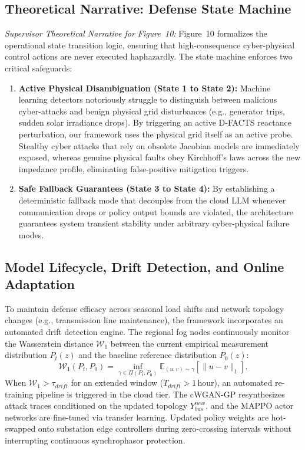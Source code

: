 \documentclass[journal,compsoc]{IEEEtran}
\begin{document}
\subsection{Theoretical Narrative: Defense State Machine}
\label{sec:narrative_fig10}
\textit{Supervisor Theoretical Narrative for Figure~10:}
Figure~10 formalizes the operational state transition logic, ensuring that high-consequence cyber-physical control actions are never executed haphazardly. The state machine enforces two critical safeguards:
\begin{enumerate}
    \item \textbf{Active Physical Disambiguation (State 1 to State 2):} Machine learning detectors notoriously struggle to distinguish between malicious cyber-attacks and benign physical grid disturbances (e.g., generator trips, sudden solar irradiance drops). By triggering an active D-FACTS reactance perturbation, our framework uses the physical grid itself as an active probe. Stealthy cyber attacks that rely on obsolete Jacobian models are immediately exposed, whereas genuine physical faults obey Kirchhoff's laws across the new impedance profile, eliminating false-positive mitigation triggers.
    \item \textbf{Safe Fallback Guarantees (State 3 to State 4):} By establishing a deterministic fallback mode that decouples from the cloud LLM whenever communication drops or policy output bounds are violated, the architecture guarantees system transient stability under arbitrary cyber-physical failure modes.
\end{enumerate}

\subsection{Model Lifecycle, Drift Detection, and Online Adaptation}
To maintain defense efficacy across seasonal load shifts and network topology changes (e.g., transmission line maintenance), the framework incorporates an automated drift detection engine. The regional fog nodes continuously monitor the Wasserstein distance $\mathcal{W}_1$ between the current empirical measurement distribution $P_t(z)$ and the baseline reference distribution $P_0(z)$:
\begin{equation}
    \mathcal{W}_1(P_t, P_0) = \inf_{\gamma \in \Pi(P_t, P_0)} \mathbb{E}_{(u, v) \sim \gamma}[\|u - v\|_1].
\end{equation}
When $\mathcal{W}_1 > \tau_{drift}$ for an extended window ($T_{drift} > 1$\,hour), an automated re-training pipeline is triggered in the cloud tier. The cWGAN-GP resynthesizes attack traces conditioned on the updated topology $Y_{bus}^{new}$, and the MAPPO actor networks are fine-tuned via transfer learning. Updated policy weights are hot-swapped onto substation edge controllers during zero-crossing intervals without interrupting continuous synchrophasor protection.
\end{document}
